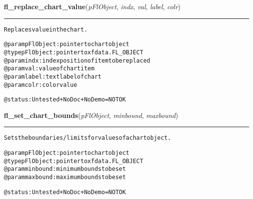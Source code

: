     \label{xformslib:flchart:fl_replace_chart_value}

    \vspace{0.5ex}

\hspace{.8\funcindent}\begin{boxedminipage}{\funcwidth}

    \raggedright \textbf{fl\_replace\_chart\_value}(\textit{pFlObject}, \textit{indx}, \textit{val}, \textit{label}, \textit{colr})

    \vspace{-1.5ex}

    \rule{\textwidth}{0.5\fboxrule}
\setlength{\parskip}{2ex}
\begin{alltt}
        Replaces value in the chart.

        @param pFlObject: pointer to chart object
@type pFlObject: pointer to xfdata.FL\_OBJECT
        @param indx: index position of item to be replaced
        @param val: value of chart item
        @param label: text label of chart
        @param colr: color value

        @status: Untested + NoDoc + NoDemo = NOT OK
    
\end{alltt}

\setlength{\parskip}{1ex}
    \end{boxedminipage}

    \label{xformslib:flchart:fl_set_chart_bounds}

    \vspace{0.5ex}

\hspace{.8\funcindent}\begin{boxedminipage}{\funcwidth}

    \raggedright \textbf{fl\_set\_chart\_bounds}(\textit{pFlObject}, \textit{minbound}, \textit{maxbound})

    \vspace{-1.5ex}

    \rule{\textwidth}{0.5\fboxrule}
\setlength{\parskip}{2ex}
\begin{alltt}
        Sets the boundaries/limits for values of a chart object.

        @param pFlObject: pointer to chart object
@type pFlObject: pointer to xfdata.FL\_OBJECT
        @param minbound: minimum bounds to be set
        @param maxbound: maximum bounds to be set

        @status: Untested + NoDoc + NoDemo = NOT OK
    
\end{alltt}

\setlength{\parskip}{1ex}
    \end{boxedminipage}

